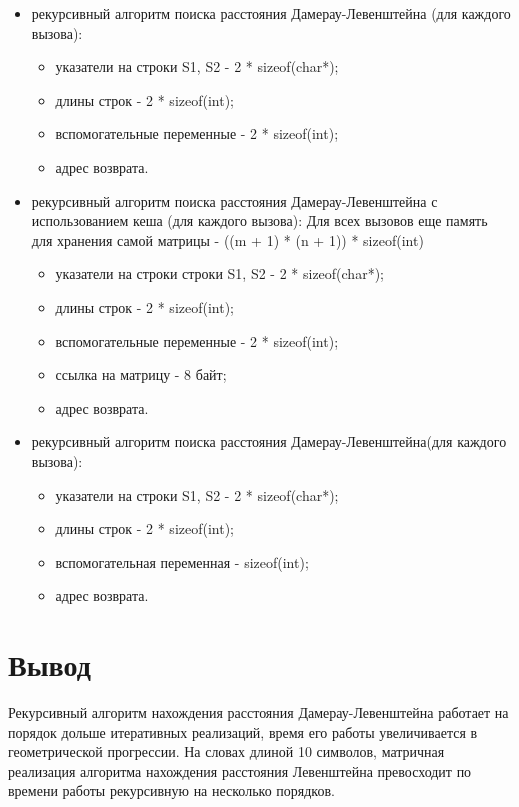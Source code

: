 \begin{itemize}
	\item рекурсивный алгоритм поиска расстояния Дамерау-Левенштейна (для каждого вызова):\begin{itemize}
		\item указатели на строки S1, S2 - 2 * sizeof(char*);
		\item длины строк - 2 * sizeof(int);
		\item вспомогательные переменные -  2 * sizeof(int);
		\item адрес возврата.
	\end{itemize}
	\item рекурсивный алгоритм поиска расстояния Дамерау-Левенштейна с использованием кеша (для каждого вызова): Для всех вызовов еще память для хранения самой матрицы -  ((m + 1) * (n + 1)) * sizeof(int) \begin{itemize}
		\item указатели на строки строки S1, S2 - 2 * sizeof(char*);
		\item длины строк - 2 * sizeof(int);
		\item вспомогательные переменные -  2 * sizeof(int);
		\item ссылка на матрицу - 8 байт;
		\item адрес возврата.
	\end{itemize}
	\item рекурсивный алгоритм поиска расстояния Дамерау-Левенштейна(для каждого вызова):\begin{itemize}
		\item указатели на строки S1, S2 - 2 * sizeof(char*);
		\item длины строк - 2 * sizeof(int);
		\item вспомогательная переменная -  sizeof(int);
		\item адрес возврата.
	\end{itemize}
\end{itemize}


\section*{Вывод}

Рекурсивный алгоритм нахождения расстояния Дамерау-Левенштейна работает на порядок дольше итеративных реализаций, время его работы увеличивается в геометрической прогрессии. На словах длиной 10 символов, матричная реализация алгоритма нахождения расстояния Левенштейна превосходит по времени работы рекурсивную на несколько порядков.

